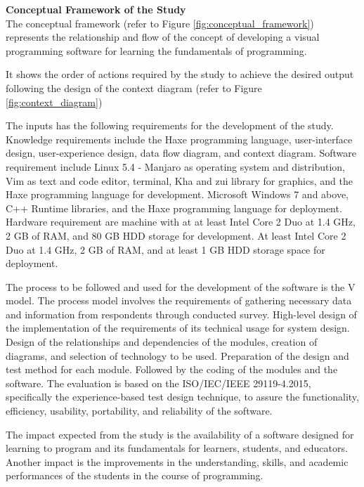 \flushleft
\textbf{Conceptual Framework of the Study}\\

\justifying
\parx
The conceptual framework (refer to Figure \ref{fig:conceptual_framework}) represents the relationship
and flow of the concept of developing a visual programming software for learning the
fundamentals of programming.

\parx
It shows the order of actions required by the study to achieve the desired
output following the design of the context diagram (refer to Figure \ref{fig:context_diagram})

\parx
The inputs has the following requirements for the development of the study.
Knowledge requirements include the Haxe programming language, user-interface
design, user-experience design, data flow diagram, and context diagram.
Software requirement include Linux 5.4 - Manjaro as operating system and
distribution, Vim as text and code editor, terminal, Kha and zui library for
graphics, and the Haxe programming language for development. Microsoft Windows 7
and above, C++ Runtime libraries, and the Haxe programming language for
deployment.  Hardware requirement are machine with at at least Intel Core 2 Duo
at 1.4 GHz, 2 GB of RAM, and 80 GB HDD storage for development. At least Intel
Core 2 Duo at 1.4 GHz, 2 GB of RAM, and at least 1 GB HDD storage space for
deployment.

\parx
The process to be followed and used for the development of the software is the V model.
The process model involves the requirements of gathering necessary data and information
from respondents through conducted survey. High-level design of the implementation of
the requirements of its technical usage for system design. Design of the relationships
and dependencies of the modules, creation of diagrams, and selection of technology to
be used. Preparation of the design and test method for each module. Followed by the
coding of the modules and the software. The evaluation is based on the ISO/IEC/IEEE
29119-4.2015, specifically the experience-based test design technique, to assure the
functionality, efficiency, usability, portability, and reliability of the software.

\parx
The impact expected from the study is the availability of a software designed for
learning to program and its fundamentals for learners, students, and educators.
Another impact is the improvements in the understanding, skills, and academic
performances of the students in the course of programming.

